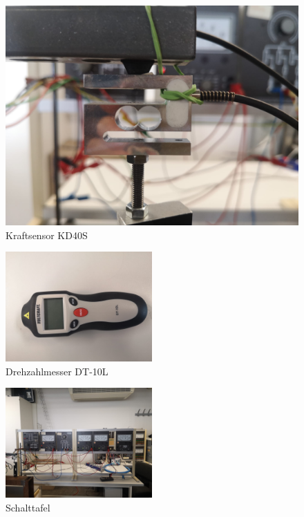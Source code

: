 \begin{figure}[H]
\begin{minipage}{0.49\textwidth}
	\includegraphics[width=1\textwidth]{Abbildungen/Kraftsensor.jpeg}
	\caption{Kraftsensor KD40S}
	\label{fig:KD40S}
\end{minipage}
\end{figure}
\begin{figure}[!ht]
    \centering
    \includegraphics[width=0.5\textwidth]{Abbildungen/Drehzahlmesser 1.jpeg}
    \caption{Drehzahlmesser DT-10L}
    \label{fig:DT-10L}
\end{figure}
\begin{figure}[!ht]
    \centering
    \includegraphics[width=0.5\textwidth]{Abbildungen/Schalttafel.jpeg}
    \caption{Schalttafel}
    \label{fig:Schalttafel}
\end{figure}
